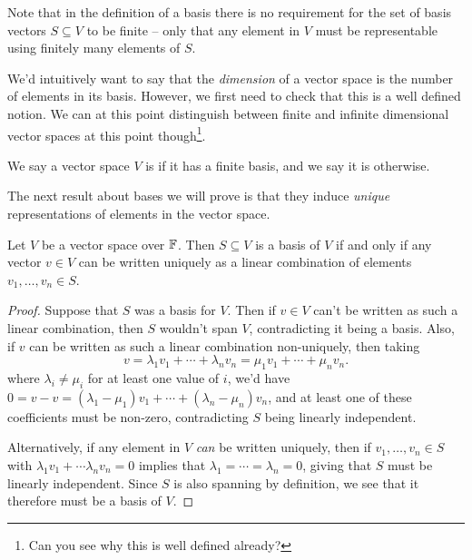 \documentclass[a4paper]{scrartcl}
\begin{document}
\begin{remark}
    Note that in the definition of a basis there is no requirement for the set of basis vectors $S \subseteq V$ to be finite -- only that any element in $V$ must be representable using finitely many elements of $S$. 
\end{remark}

We'd intuitively want to say that the \emph{dimension} of a vector space is the number of elements in its basis. However, we first need to check that this is a well defined notion.
We can at this point distinguish between finite and infinite dimensional vector spaces at this point though\footnote{Can you see why this is well defined already?}.

\begin{definition}
    We say a vector space $V$ is  if it has a finite basis, and we say it is  otherwise.
\end{definition}

The next result about bases we will prove is that they induce \emph{unique} representations of elements in the vector space.

\begin{lemma}
    Let $V$ be a vector space over $\mathbb{F}$. Then $S \subseteq V$ is a basis of $V$ if and only if any vector $v \in V$ can be written uniquely as a linear combination of elements $v_1, \dots, v_n \in S$.
\end{lemma}
\begin{proof}
    Suppose that $S$ was a basis for $V$.
    Then if $v \in V$ can't be written as such a linear combination, then $S$ wouldn't span $V$, contradicting it being a basis.
    Also, if $v$ can be written as such a linear combination non-uniquely, then taking
    $$
v = \lambda_1 v_1 + \cdots + \lambda_n v_n = \mu_1 v_1 + \cdots + \mu_n v_n.
    $$
    where $\lambda_i \neq \mu_i$ for at least one value of $i$, we'd have
    $0 = v - v = (\lambda_1 - \mu_1) v_1 + \cdots + (\lambda_n - \mu_n)v_n$,
    and at least one of these coefficients must be non-zero, contradicting $S$ being linearly independent.

    Alternatively, if any element in $V$ \emph{can} be written uniquely, then if $v_1, \dots, v_n \in S$ with $\lambda_1 v_1 + \cdots \lambda_n v_n = 0$ implies that $\lambda_1 = \cdots = \lambda_n = 0$, giving that $S$ must be linearly independent. Since $S$ is also spanning by definition, we see that it therefore must be a basis of $V$.
\end{proof}
\end{document}
